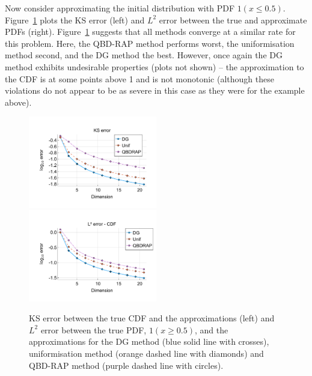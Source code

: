 \begin{example}Now consider approximating the initial distribution with PDF \(1(x\leq 0.5)\). Figure~\ref{fig: fun 2 comp} plots the KS error (left) and \(L^2\) error between the true and approximate PDFs (right). Figure~\ref{fig: fun 2 comp} suggests that all methods converge at a similar rate for this problem. Here, the QBD-RAP method performs worst, the uniformisation method second, and the DG method the best. However, once again the DG method exhibits undesirable properties (plots not shown) -- the approximation to the CDF is at some points above 1 and is not monotonic (although these violations do not appear to be as severe in this case as they were for the example above). 
\begin{figure}[h]
	\centering
	\includegraphics[width=0.5\textwidth,trim={1.25cm 0.8cm 0.25cm 1.25cm},clip]{chapter6/figs/comp/fun2/meshs_ks_error_formatted.pdf}%
	\includegraphics[width=0.5\textwidth,trim={1.25cm 0.8cm 0.25cm 1.25cm},clip]{chapter6/figs/comp/fun2/meshs_l2_pdf_error_formatted.pdf}
	\caption{KS error between the true CDF and the approximations (left) and \(L^2\) error between the true PDF, \(1(x\geq 0.5)\), and the approximations for the DG method (blue solid line with crosses), uniformisation method (orange dashed line with diamonds) and QBD-RAP method (purple dashed line with circles).}
	\label{fig: fun 2 comp} 
\end{figure}
\exampleFloatBarrier
\end{example}

